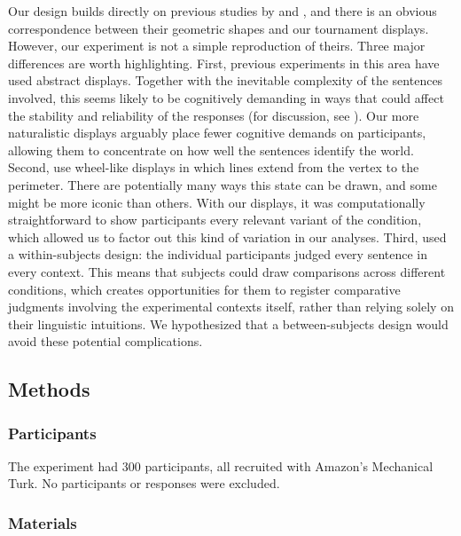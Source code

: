 \documentclass[leqno,12pt]{article}
\begin{document}
Our design builds directly on previous studies by
\citet{Geurts:Pouscoulous:2009} and \citet{Chemla:Spector:2011}, and
there is an obvious correspondence between their geometric shapes and
our tournament displays. However, our experiment is not a simple
reproduction of theirs. Three major differences are worth
highlighting. First, previous experiments in this area have used
abstract displays. Together with the inevitable complexity
of the sentences involved, this seems likely to be cognitively
demanding in ways that could affect the stability and reliability of
the responses (for discussion, see \citealt{Clifton:Dube:2010}). Our
more naturalistic displays arguably place fewer cognitive demands on
participants, allowing them to concentrate on how well the sentences
identify the world.  Second, \citeauthor{Chemla:Spector:2011} use
wheel-like displays in which lines extend from the vertex to the
perimeter. There are potentially many ways this state can be drawn,
and some might be more iconic than others. With our displays, it was
computationally straightforward to show participants every relevant
variant of the condition, which allowed us to factor out this kind of
variation in our analyses.  Third, \citeauthor{Chemla:Spector:2011}
used a within-subjects design: the individual participants judged
every sentence in every context. This means that subjects could draw
comparisons across different conditions, which creates opportunities
for them to register comparative judgments involving the experimental
contexts itself, rather than relying solely on their linguistic
intuitions. We hypothesized that a between-subjects design would avoid
these potential complications.


\subsection{Methods}

\subsubsection{Participants}

The experiment had 300 participants, all recruited with Amazon's
Mechanical Turk. No participants or responses were excluded.

\subsubsection{Materials}
\end{document}
